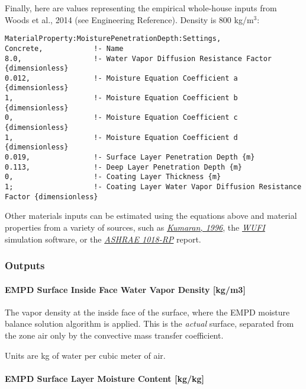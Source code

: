 Finally, here are values representing the empirical whole-house inputs from Woods et al., 2014 (see Engineering Reference). Density is 800 kg/m$^3$:

\begin{lstlisting}
MaterialProperty:MoisturePenetrationDepth:Settings,
Concrete,            !- Name
8.0,                 !- Water Vapor Diffusion Resistance Factor {dimensionless}
0.012,               !- Moisture Equation Coefficient a {dimensionless}
1,                   !- Moisture Equation Coefficient b {dimensionless}
0,                   !- Moisture Equation Coefficient c {dimensionless}
1,                   !- Moisture Equation Coefficient d {dimensionless}
0.019,               !- Surface Layer Penetration Depth {m}
0.113,               !- Deep Layer Penetration Depth {m}
0,                   !- Coating Layer Thickness {m}
1;                   !- Coating Layer Water Vapor Diffusion Resistance Factor {dimensionless}
\end{lstlisting}

Other materials inputs can be estimated using the equations above and material properties from a variety of sources, such as \href{http://www.iea-ebc.org/fileadmin/user_upload/images/Pictures/EBC_Annex_24_Report_3.pdf}{\emph{Kumaran, 		1996}}, the \href{http://WUFI.de/en/}{\emph{WUFI}} simulation software, or the \href{http://www.techstreet.com/products/1719052}{\emph{ASHRAE 1018-RP}} report.

\subsubsection{Outputs}\label{moisture-penetration-depth-empd-outputs}

\paragraph{EMPD Surface Inside Face Water Vapor Density {[}kg/m3{]}}\label{empd-surface-inside-face-water-vapor-density-kgm3}

The vapor density at the inside face of the surface, where the EMPD moisture balance solution algorithm is applied. This is the \emph{actual} surface, separated from the zone air only by the convective mass transfer coefficient.

Units are kg of water per cubic meter of air.

\paragraph{EMPD Surface Layer Moisture Content {[}kg/kg{]}}\label{empd-surface-layer-moisture-content-kgkg}

